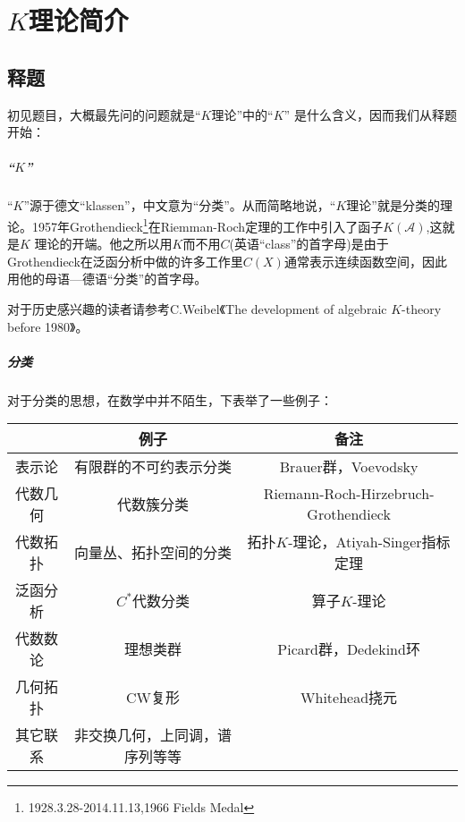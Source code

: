 % 

\chapter{$K$理论简介}
\section{释题}
初见题目，大概最先问的问题就是“$K$理论”中的“$K$” 是什么含义，因而我们从释题开始：
\paragraph{“$K$”}
“$K$”源于德文“klassen”，中文意为“分类”。从而简略地说，“$K$理论”就是分类的理论。1957年Grothendieck\footnote{1928.3.28-2014.11.13,1966 Fields Medal}在Riemman-Roch定理的工作中引入了函子$K(\mathcal {A})$,这就是$K$ 理论的开端。他之所以用$K$而不用$C$(英语“class”的首字母)是由于Grothendieck在泛函分析中做的许多工作里$C(X)$通常表示连续函数空间，因此用他的母语---德语“分类”的首字母。

对于历史感兴趣的读者请参考C.Weibel《The development of algebraic  $K$-theory before 1980》。

\paragraph{分类}
对于分类的思想，在数学中并不陌生，下表举了一些例子：\\
\begin{tabular}{c|c|c}
 &例子 &备注\\
 \hline
 表示论&有限群的不可约表示分类 & Brauer群，Voevodsky \\
\hline
代数几何	&代数簇分类&Riemann-Roch-Hirzebruch-Grothendieck\\
\hline
代数拓扑 &向量丛、拓扑空间的分类 &拓扑$K$-理论，Atiyah-Singer指标定理\\
\hline
泛函分析 &$C^*$代数分类&算子$K$-理论 \\
\hline
代数数论 &理想类群 &Picard群，Dedekind环\\
\hline
几何拓扑 &CW复形 &Whitehead挠元\\
\hline
其它联系&  非交换几何，上同调，谱序列等等\\

\end{tabular}
